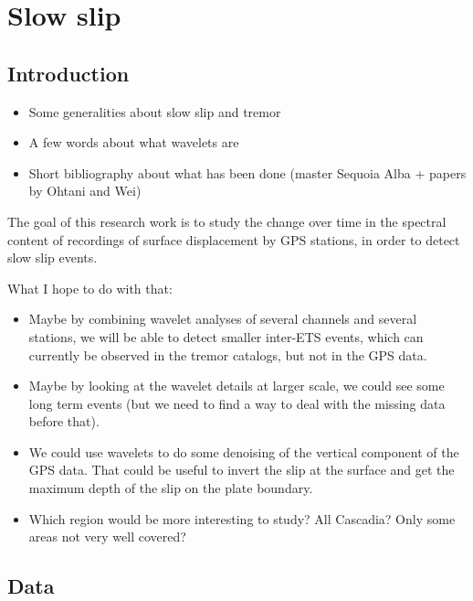 \documentclass[main.tex]{subfiles}
\begin{document}
\part{Slow slip}

\chapter{Introduction}

\begin{itemize}
	\item Some generalities about slow slip and tremor
	\item A few words about what wavelets are
	\item Short bibliography about what has been done (master Sequoia Alba + papers by Ohtani and Wei)
\end{itemize}

The goal of this research work is to study the change over time in the spectral content of recordings of surface displacement by GPS stations, in order to detect slow slip events.

What I hope to do with that:

\begin{itemize}

\item Maybe by combining wavelet analyses of several channels and several stations, we will be able to detect smaller inter-ETS events, which can currently be observed in the tremor catalogs, but not in the GPS data.

\item Maybe by looking at the wavelet details at larger scale, we could see some long term events (but we need to find a way to deal with the missing data before that).

\item We could use wavelets to do some denoising of the vertical component of the GPS data. That could be useful to invert the slip at the surface and get the maximum depth of the slip on the plate boundary.

\item Which region would be more interesting to study? All Cascadia? Only some areas not very well covered?

\end{itemize} 

\chapter{Data}
\end{document}
